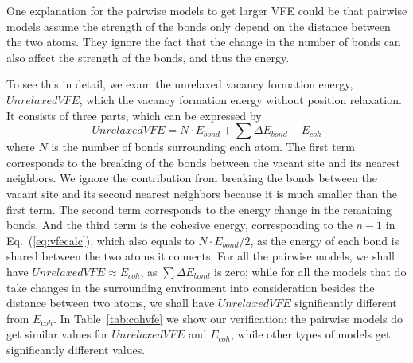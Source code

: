 \documentclass[%
 reprint,
 amsmath,amssymb,
 aps,
]{revtex4-1}
\begin{document}
One explanation for the pairwise models to get larger VFE could be that pairwise models assume the strength of the bonds only depend on the distance between the two atoms.
They ignore the fact that the change in the number of bonds can also affect the strength of the bonds, and thus the energy.

To see this in detail, we exam the unrelaxed vacancy formation energy, $\mathit{UnrelaxedVFE}$, which the vacancy formation energy without position relaxation.
It consists of three parts, which can be expressed by
\begin{equation}
\label{eq:vfedecomp}
\mathit{UnrelaxedVFE} = N\cdot E_{bond} + \sum\Delta E_{bond} - E_{coh}
\end{equation}
where $N$ is the number of bonds surrounding each atom.
The first term corresponds to the breaking of the bonds between the vacant site and its nearest neighbors.
We ignore the contribution from breaking the bonds between the vacant site and its second nearest neighbors because it is much smaller than the first term.
The second term corresponds to the energy change in the remaining bonds.
And the third term is the cohesive energy, corresponding to the $n-1$ in Eq.~(\ref{eq:vfecalc}), which also equals to $N\cdot E_{bond}/2$, as the energy of each bond is shared between the two atoms it connects.
For all the pairwise models, we shall have $\mathit{UnrelaxedVFE}\approx E_{coh}$, as $\sum\Delta E_{bond}$ is zero; while for all the models that do take changes in the surrounding environment into consideration besides the distance between two atoms, we shall have $\mathit{UnrelaxedVFE}$ significantly different from $E_{coh}$.
In Table~\ref{tab:cohvfe} we show our verification: the pairwise models do get similar values for $\mathit{UnrelaxedVFE}$ and $E_{coh}$, while other types of models get significantly different values.
\end{document}
